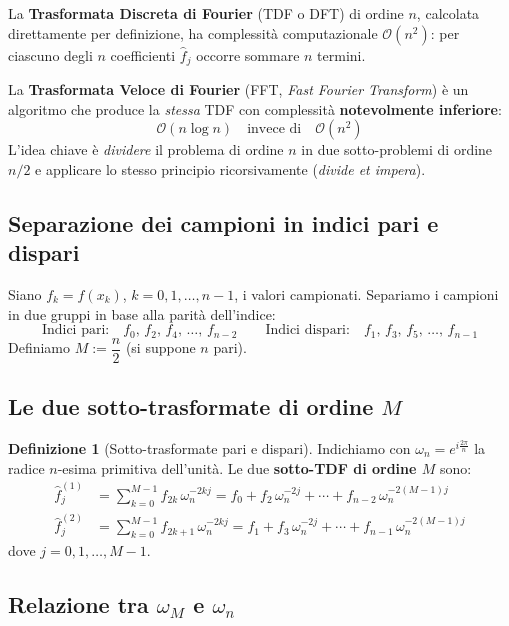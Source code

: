 \documentclass[a4paper,12pt]{article}
\theoremstyle{definition}
\newtheorem{definizione}{Definizione}[section]
\theoremstyle{remark}
\begin{document}
La \textbf{Trasformata Discreta di Fourier} (TDF o DFT) di ordine $n$,
calcolata direttamente per definizione, ha complessità computazionale
$\mathcal{O}(n^2)$: per ciascuno degli $n$ coefficienti $\hat{f}_j$
occorre sommare $n$ termini.

La \textbf{Trasformata Veloce di Fourier} (FFT, \emph{Fast Fourier
Transform}) è un algoritmo che produce la \emph{stessa} TDF con
complessità \textbf{notevolmente inferiore}:
\[
  \mathcal{O}(n \log n) \quad \text{invece di} \quad \mathcal{O}(n^2)
\]
L'idea chiave è \emph{dividere} il problema di ordine $n$ in due
sotto-problemi di ordine $n/2$ e applicare lo stesso principio
ricorsivamente (\emph{divide et impera}).

\subsection{Separazione dei campioni in indici pari e dispari}

Siano $f_k = f(x_k)$, $k = 0, 1, \ldots, n-1$, i valori campionati.
Separiamo i campioni in due gruppi in base alla parità dell'indice:
\[
  \text{Indici pari:}\quad   f_0,\, f_2,\, f_4,\, \ldots,\, f_{n-2}
  \qquad
  \text{Indici dispari:}\quad f_1,\, f_3,\, f_5,\, \ldots,\, f_{n-1}
\]
Definiamo $M := \dfrac{n}{2}$ (si suppone $n$ pari).

\subsection{Le due sotto-trasformate di ordine \texorpdfstring{$M$}{M}}

\begin{definizione}[Sotto-trasformate pari e dispari]
Indichiamo con $\omega_n = e^{i\frac{2\pi}{n}}$ la radice $n$-esima
primitiva dell'unità. Le due \textbf{sotto-TDF di ordine $M$} sono:
\begin{align}
  \hat{f}_j^{(1)}
  &= \sum_{k=0}^{M-1} f_{2k}\,\omega_n^{-2kj}
   = f_0 + f_2\,\omega_n^{-2j} + \cdots + f_{n-2}\,\omega_n^{-2(M-1)j}
   \label{eq:fft-pari} \\[6pt]
  \hat{f}_j^{(2)}
  &= \sum_{k=0}^{M-1} f_{2k+1}\,\omega_n^{-2kj}
   = f_1 + f_3\,\omega_n^{-2j} + \cdots + f_{n-1}\,\omega_n^{-2(M-1)j}
   \label{eq:fft-dispari}
\end{align}
dove $j = 0, 1, \ldots, M-1$.
\end{definizione}

\subsection{Relazione tra \texorpdfstring{$\omega_M$}{omegaM} e \texorpdfstring{$\omega_n$}{omegan}}
\end{document}
